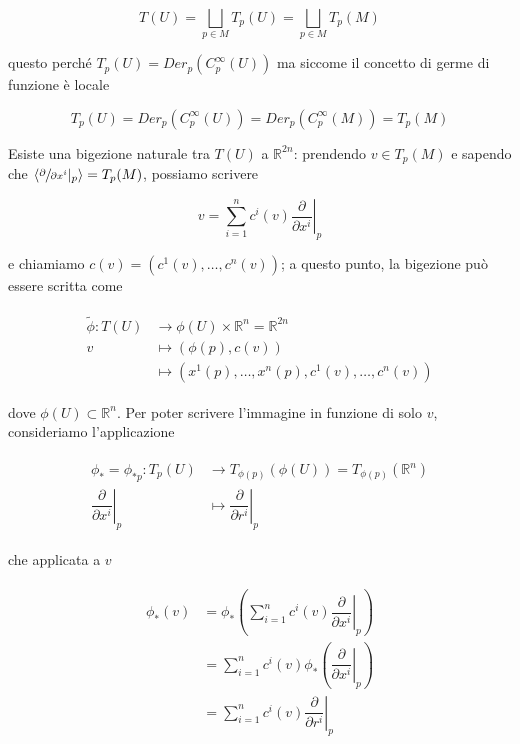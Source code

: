 \begin{equation}
	T(U) = \bigsqcup_{p \in M} T_{p}(U) = \bigsqcup_{p \in M} T_{p}(M)
\end{equation}

questo perché $ T_{p}(U) = Der_{p}(C_{p}^{\infty}(U)) $ ma siccome il concetto di germe di funzione è locale

\begin{equation}
	T_{p}(U) = Der_{p}(C_{p}^{\infty}(U)) = Der_{p}(C_{p}^{\infty}(M)) = T_{p}(M)
\end{equation}

Esiste una bigezione naturale tra $ T(U) $ a $ \mathbb{R}^{2n} $: prendendo $ v \in T_{p}(M) $ e sapendo che $ \langle \sfrac{\partial}{\partial x^{i}} |_{p} \rangle = T_{p}(M) $, possiamo scrivere

\begin{equation}
	v = \sum_{i=1}^{n} c^{i}(v) \left. \dfrac{\partial}{\partial x^{i}} \right|_{p}
\end{equation}

e chiamiamo $ c(v) = (c^{1}(v),\dots,c^{n}(v)) $; a questo punto, la bigezione può essere scritta come

\begin{align}
	\begin{split}
		\tilde{\phi} : T(U) &\to \phi(U) \times \mathbb{R}^{n} = \mathbb{R}^{2n}\\
		v &\mapsto (\phi(p),c(v))\\
		&\mapsto (x^{1}(p),\dots,x^{n}(p),c^{1}(v),\dots,c^{n}(v))
	\end{split}
\end{align}

dove $ \phi(U) \subset \mathbb{R}^{n} $. Per poter scrivere l'immagine in funzione di solo $ v $, consideriamo l'applicazione

\begin{align}
	\begin{split}
		\phi_{*} = \phi_{*p} : T_{p}(U) &\to T_{\phi(p)}(\phi(U)) =  T_{\phi(p)}(\mathbb{R}^{n})\\
		\left. \dfrac{\partial}{\partial x^{i}} \right|_{p} &\mapsto \left. \dfrac{\partial}{\partial r^{i}} \right|_{p}
	\end{split}
\end{align}

che applicata a $ v $

\begin{align}
	\begin{split}
		\phi_{*}(v) &= \phi_{*} \left( \sum_{i=1}^{n} c^{i}(v) \left. \dfrac{\partial}{\partial x^{i}} \right|_{p} \right)\\
		&= \sum_{i=1}^{n} c^{i}(v) \phi_{*} \left( \left. \dfrac{\partial}{\partial x^{i}} \right|_{p} \right)\\
		&= \sum_{i=1}^{n} c^{i}(v) \left. \dfrac{\partial}{\partial r^{i}} \right|_{p}
	\end{split}
\end{align}

